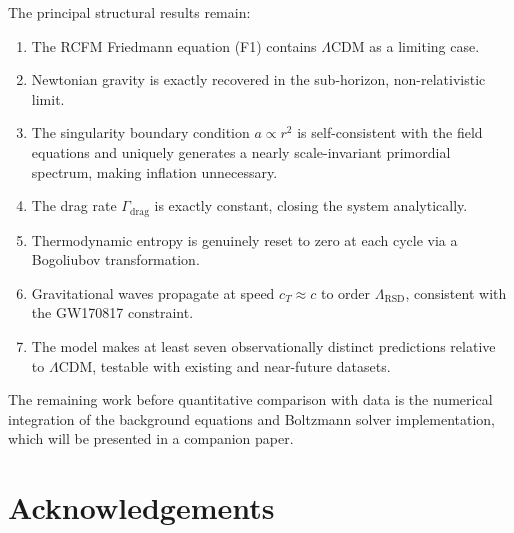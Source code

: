 \documentclass[10pt,twocolumn]{article}
\theoremstyle{definition}
\newcommand{\Gammadrag}{\Gamma_{\mathrm{drag}}}
\begin{document}
The principal structural results remain:
\begin{enumerate}
  \item The RCFM Friedmann equation (F1) contains
    $\Lambda$CDM as a limiting case.
  \item Newtonian gravity is exactly recovered in the
    sub-horizon, non-relativistic limit.
  \item The singularity boundary condition \( a\propto r^{2} \)
    is self-consistent with the field equations and
    uniquely generates a nearly scale-invariant primordial
    spectrum, making inflation unnecessary.
  \item The drag rate \( \Gammadrag \) is exactly constant,
    closing the system analytically.
  \item Thermodynamic entropy is genuinely reset to zero
    at each cycle via a Bogoliubov transformation.
  \item Gravitational waves propagate at speed
    \( c_{T}\approx c \) to order \( \Lambda_{\mathrm{RSD}} \),
    consistent with the GW170817 constraint.
  \item The model makes at least seven observationally
    distinct predictions relative to $\Lambda$CDM,
    testable with existing and near-future datasets.
\end{enumerate}

The remaining work before quantitative comparison with
data is the numerical integration of the background
equations and Boltzmann solver implementation, which will
be presented in a companion paper.

\section*{Acknowledgements}
\noindent
[To be completed.] 

\newpage


\end{document}
